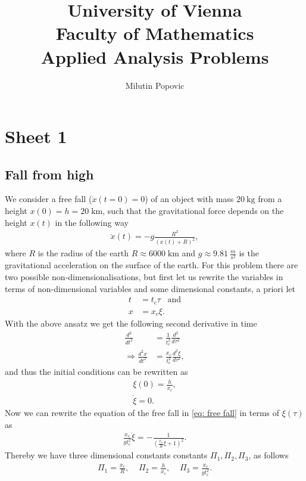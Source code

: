 \documentclass[a4paper]{article}
\title{University of Vienna\\ Faculty of Mathematics\\
\vspace{1cm}Applied Analysis Problems
}
\author{Milutin Popovic}
\begin{document}
\maketitle
\tableofcontents

\section{Sheet 1}

\subsection{Fall from high}
We consider a free fall ($\dot{x}(t=0)=0$) of an object with mass $20\
\text{kg}$ from a height $x(0) = h = 20\; \text{km}$, such that the
gravitational force depends on the height $x(t)$ in the following way
\begin{align}\label{eq: free fall}
    \ddot{x}(t) = -g\frac{R^2}{(x(t) + R)^2},
\end{align}
where $R$ is the radius of the earth $R \approx 6000\; \text{km}$ and $g
\approx 9.81\ \frac{m}{s^2}$ is the gravitational acceleration on the surface
of the earth. For this problem there are two possible non-dimensionalisations,
but first let us rewrite the variables in terms of non-dimensional variables
and some dimensional constants, a priori let
\begin{align}
    t &= t_c \tau \;\;\; \text{and}\\
    x &= x_c \xi.
\end{align}
With the above ansatz we get the following second derivative in
time
\begin{align}
        \frac{d^2}{dt^2} &= \frac{1}{t_c^2}\frac{d^2}{d\tau^2} \\
        \Rightarrow \frac{d^2x}{dt^2} &= \frac{x_c}{t_c^2}
        \frac{d^2\xi}{d\tau^2},
\end{align}
and thus the initial conditions can be rewritten as
\begin{align}
    \xi(0) = \frac{h}{x_c},\\
    \dot{\xi} = 0.
\end{align}
Now we can rewrite the equation of the free fall in \ref{eq: free fall} in
terms of $\xi(\tau)$ as
\begin{align}
   \frac{x_c}{gt_c^2} \ddot{\xi} = -\frac{1}{(\frac{x_c}{R}\xi +1)^2}.
\end{align}
Thereby we have three dimensional constants constants $\Pi_1, \Pi_2, \Pi_3$,
as follows
\begin{align}
    \Pi_1 = \frac{x_c}{R}, \;\;\;\; \Pi_2 = \frac{h}{x_c}, \;\;\;\;
    \Pi_3 = \frac{x_c}{gt_c^2}.
\end{align}
\end{document}
